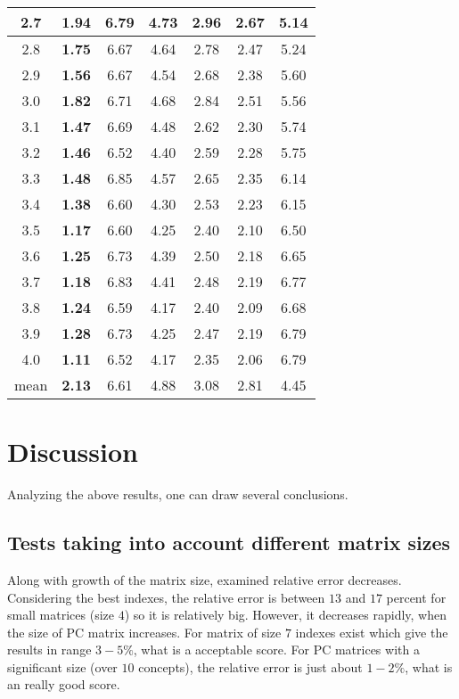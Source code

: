 \begin{table}[h]
\begin{center}
\begin{tabular}{|c||c|c|c|c|c|c|}
2.7 & \textbf{1.94} & 6.79 & 4.73 & 2.96 & 2.67 & 5.14 \\ \hline
2.8 & \textbf{1.75} & 6.67 & 4.64 & 2.78 & 2.47 & 5.24 \\ \hline
2.9 & \textbf{1.56} & 6.67 & 4.54 & 2.68 & 2.38 & 5.60 \\ \hline
3.0 & \textbf{1.82} & 6.71 & 4.68 & 2.84 & 2.51 & 5.56 \\ \hline
3.1 & \textbf{1.47} & 6.69 & 4.48 & 2.62 & 2.30 & 5.74 \\ \hline
3.2 & \textbf{1.46} & 6.52 & 4.40 & 2.59 & 2.28 & 5.75 \\ \hline
3.3 & \textbf{1.48} & 6.85 & 4.57 & 2.65 & 2.35 & 6.14 \\ \hline
3.4 & \textbf{1.38} & 6.60 & 4.30 & 2.53 & 2.23 & 6.15 \\ \hline
3.5 & \textbf{1.17} & 6.60 & 4.25 & 2.40 & 2.10 & 6.50 \\ \hline
3.6 & \textbf{1.25} & 6.73 & 4.39 & 2.50 & 2.18 & 6.65 \\ \hline
3.7 & \textbf{1.18} & 6.83 & 4.41 & 2.48 & 2.19 & 6.77 \\ \hline
3.8 & \textbf{1.24} & 6.59 & 4.17 & 2.40 & 2.09 & 6.68 \\ \hline
3.9 & \textbf{1.28} & 6.73 & 4.25 & 2.47 & 2.19 & 6.79 \\ \hline
4.0 & \textbf{1.11} & 6.52 & 4.17 & 2.35 & 2.06 & 6.79 \\ \hline \hline
mean & \textbf{2.13} & 6.61 & 4.88 & 3.08 & 2.81 & 4.45 \\ \hline 
\end{tabular}
\end{center}
\end{table}



\section{Discussion}
Analyzing the above results, one can draw several conclusions.

\subsection{Tests taking into account different matrix sizes}
Along with growth of the matrix size, examined relative error decreases. Considering the best indexes, the relative error is between $13$ and $17$ percent for small matrices (size $4$) so it is relatively big. However, it decreases rapidly, when the size of PC matrix increases. For matrix of size $7$ indexes exist which give the results in range $3 - 5 \%$, what is a acceptable score. For PC matrices with a significant size (over $10$ concepts), the relative error is just about $1 - 2 \%$, what is an really good score.

